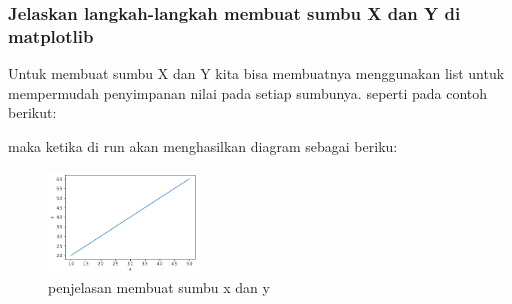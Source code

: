 \subsubsection{Jelaskan langkah-langkah membuat sumbu X dan Y di matplotlib}
\hfill \break
Untuk membuat sumbu X dan Y kita bisa membuatnya menggunakan list untuk mempermudah penyimpanan nilai pada setiap sumbunya. seperti pada contoh berikut:


maka ketika di run akan menghasilkan diagram sebagai beriku:
\begin{figure}[ht]	
    \includegraphics[width=4cm]{figures/6/1174083/Teori/1.png}
    \centering
    \caption{penjelasan membuat sumbu x dan y}
    \label{1}
\end{figure}

